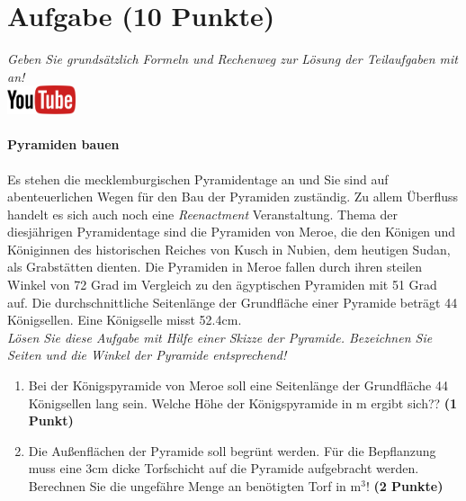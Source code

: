 \documentclass[a4paper, 9pt]{scrartcl}\usepackage[]{graphicx}\usepackage[]{xcolor}
\begin{document}
 
\clearpage

\section{Aufgabe \hfill (10 Punkte)}

\textit{Geben Sie grunds{\"a}tzlich Formeln und Rechenweg zur L{\"o}sung der
  Teilaufgaben mit an!} \\[1Ex]

\hfill\href{https://youtu.be/tDgr6fpkkYA}{\includegraphics[width =
  2cm]{img/youtube}} %
\hspace{2Ex}

\paragraph{Pyramiden bauen}



Es stehen die mecklemburgischen Pyramidentage an und Sie sind auf
abenteuerlichen Wegen f{\"u}r den Bau der Pyramiden zust{\"a}ndig. Zu allem
{\"U}berfluss handelt es sich auch noch eine \textit{Reenactment}
Veranstaltung. Thema der diesj{\"a}hrigen Pyramidentage sind die Pyramiden von
Meroe, die den K{\"o}nigen und K{\"o}niginnen des historischen Reiches von Kusch in
Nubien, dem heutigen Sudan, als Grabst{\"a}tten dienten. Die Pyramiden in Meroe
fallen durch ihren steilen Winkel von 72 Grad im Vergleich zu
den {\"a}gyptischen Pyramiden mit 51 Grad auf. Die durchschnittliche
Seitenl{\"a}nge der Grundfl{\"a}che einer Pyramide betr{\"a}gt 44 K{\"o}nigsellen. Eine K{\"o}nigselle
misst 52.4cm.\\

\textit{L{\"o}sen Sie diese Aufgabe mit Hilfe einer Skizze der Pyramide. Bezeichnen
  Sie Seiten und die Winkel der Pyramide entsprechend!}

\begin{enumerate}
\item Bei der K{\"o}nigspyramide von Meroe soll eine Seitenl{\"a}nge der Grundfl{\"a}che
  44 K{\"o}nigsellen lang sein. Welche H{\"o}he der K{\"o}nigspyramide in m
  ergibt sich?? \textbf{(1 Punkt)}
\item Die Au{\ss}enfl{\"a}chen der Pyramide soll begr{\"u}nt werden. F{\"u}r die
  Bepflanzung muss eine 3cm dicke Torfschicht auf die
  Pyramide aufgebracht werden. Berechnen Sie die ungef{\"a}hre Menge an
  ben{\"o}tigten Torf in m$^3$! \textbf{(2 Punkte)}
\end{enumerate}
\end{document}
